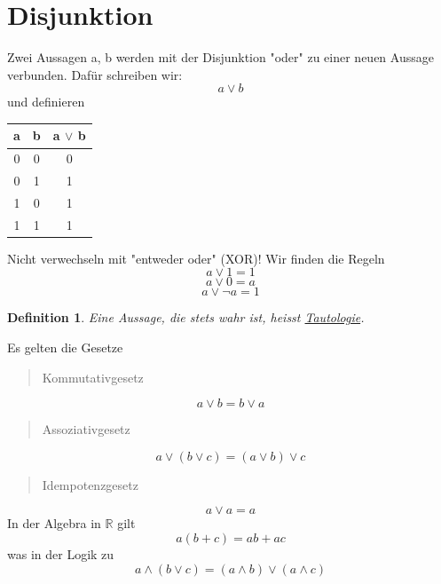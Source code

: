 \documentclass{report}
\newtheorem{mydef}{Definition}
\begin{document}
\section{Disjunktion}
Zwei Aussagen a, b werden mit der Disjunktion "oder" zu einer neuen Aussage verbunden. Dafür schreiben wir:\begin{equation}a \lor b\end{equation}
und definieren
\begin{center}\begin{tabular}{c c | c}
a & b & a \(\lor\) b\\
\hline
0 & 0 & 0  \\
0 & 1 & 1  \\
1 & 0 & 1 \\
1 & 1 & 1 \\
\end{tabular}\end{center}
Nicht verwechseln mit "entweder oder" (XOR)! Wir finden die Regeln
\begin{equation}a \lor 1 = 1\end{equation}
\begin{equation}a \lor 0 = a\end{equation}
\begin{equation}a \lor \lnot a = 1\end{equation}
\begin{mydef}Eine Aussage, die stets wahr ist, heisst \underline{Tautologie}.\end{mydef}
Es gelten die Gesetze
\begin{quote}Kommutativgesetz\end{quote}
\begin{equation}a \lor b = b \lor a\end{equation}
\begin{quote}Assoziativgesetz\end{quote}
\begin{equation}a \lor (b \lor c) = (a \lor b) \lor c\end{equation}
\begin{quote}Idempotenzgesetz\end{quote}
\begin{equation}a \lor a = a\end{equation}
In der Algebra in \(\mathbb{R}\) gilt
\begin{equation}a(b+c) = ab+ac\end{equation}
was in der Logik zu
\begin{equation} \label{eq:distributivgesetz}a \land (b \lor c) = (a \land b) \lor (a \land c)\end{equation}
\end{document}
